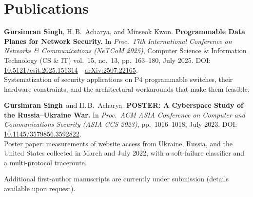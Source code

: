 \documentclass[letterpaper,10pt]{article}
\newcommand{\cvsection}[2][5]{\Needspace{#1\baselineskip}\section{#2}}
\newenvironment{pubs}{\begin{enumerate}[leftmargin=1.9em,label={[P\arabic*]},itemsep=4pt,topsep=1pt,parsep=0pt]\small}{\end{enumerate}}
\newcommand{\me}{\textbf{Gursimran Singh}}
\begin{document}
\cvsection{Publications}
\begin{pubs}
  \item \me, H.\,B.\ Acharya, and Minseok Kwon.
    \textbf{Programmable Data Planes for Network Security.}
    In \emph{Proc.\ 17th International Conference on Networks \& Communications (NeTCoM 2025)},
    Computer Science \& Information Technology (CS \& IT) vol.\ 15, no.\ 13, pp.\ 163--180, July 2025.
    DOI: \href{https://doi.org/10.5121/csit.2025.151314}{10.5121/csit.2025.151314} \,\textperiodcentered\,
    \href{https://arxiv.org/abs/2507.22165}{arXiv:2507.22165}.\\
    {\color{muted}Systematization of security applications on P4 programmable switches, their hardware constraints, and the architectural workarounds that make them feasible.}
  \item \me\ and H.\,B.\ Acharya.
    \textbf{POSTER: A Cyberspace Study of the Russia--Ukraine War.}
    In \emph{Proc.\ ACM ASIA Conference on Computer and Communications Security (ASIA CCS 2023)},
    pp.\ 1016--1018, July 2023. DOI: \href{https://doi.org/10.1145/3579856.3592822}{10.1145/3579856.3592822}.\\
    {\color{muted}Poster paper: measurements of website access from Ukraine, Russia, and the United States collected in March and July 2022, with a soft-failure classifier and a multi-protocol traceroute.}
\end{pubs}
\vspace{2pt}
{\small\color{muted}Additional first-author manuscripts are currently under submission (details available upon request).}
\end{document}
